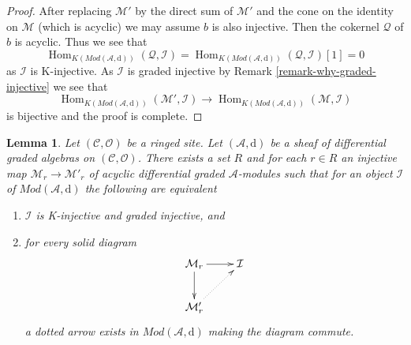 \documentclass{stacks-project}
\theoremstyle{plain}
\newtheorem{lemma}[subsection]{Lemma}
\theoremstyle{definition}
\theoremstyle{remark}
\numberwithin{equation}{subsection}
\def\Hom{\mathop{\mathrm{Hom}}\nolimits}
\begin{document}
\begin{proof}
After replacing $\mathcal{M}'$ by the direct sum of $\mathcal{M}'$
and the cone on the identity on $\mathcal{M}$ (which is acyclic)
we may assume $b$ is also injective. Then the cokernel $\mathcal{Q}$
of $b$ is acyclic. Thus we see that
$$
\Hom_{K(\textit{Mod}(\mathcal{A}, \text{d}))}(\mathcal{Q}, \mathcal{I}) =
\Hom_{K(\textit{Mod}(\mathcal{A}, \text{d}))}(\mathcal{Q}, \mathcal{I})[1] = 0
$$
as $\mathcal{I}$ is K-injective. As $\mathcal{I}$ is graded injective
by Remark \ref{remark-why-graded-injective}
we see that
$$
\Hom_{K(\textit{Mod}(\mathcal{A}, \text{d}))}(\mathcal{M}', \mathcal{I})
\longrightarrow
\Hom_{K(\textit{Mod}(\mathcal{A}, \text{d}))}(\mathcal{M}, \mathcal{I})
$$
is bijective and the proof is complete.
\end{proof}

\begin{lemma}
\label{lemma-better-set-of-monos}
Let $(\mathcal{C}, \mathcal{O})$ be a ringed site.
Let $(\mathcal{A}, \text{d})$
be a sheaf of differential graded algebras on $(\mathcal{C}, \mathcal{O})$.
There exists a set $R$ and for each $r \in R$ an injective map
$\mathcal{M}_r \to \mathcal{M}'_r$ of
acyclic differential graded $\mathcal{A}$-modules
such that for an object $\mathcal{I}$ of $\textit{Mod}(\mathcal{A}, \text{d})$
the following are equivalent
\begin{enumerate}
\item $\mathcal{I}$ is K-injective and graded injective, and
\item for every solid diagram
$$
\xymatrix{
\mathcal{M}_r \ar[r] \ar[d] & \mathcal{I} \\
\mathcal{M}'_r \ar@{..>}[ru]
}
$$
a dotted arrow exists in $\textit{Mod}(\mathcal{A}, \text{d})$
making the diagram commute.
\end{enumerate}
\end{lemma}
\end{document}
